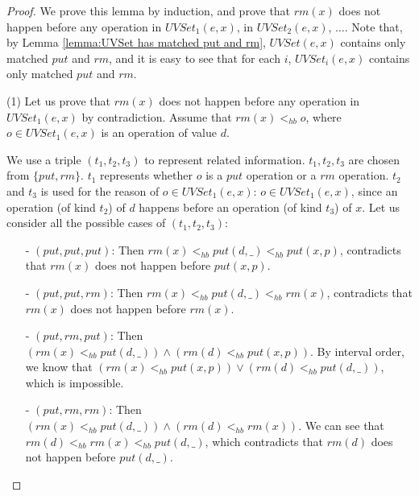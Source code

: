 \begin {proof}

We prove this lemma by induction, and prove that $\textit{rm}(x)$ does not happen before any operation in $\textit{UVSet}_1(e,x)$, in $\textit{UVSet}_2(e,x)$, $\ldots$. Note that, by Lemma \ref{lemma:UVSet has matched put and rm}, $\textit{UVSet}(e,x)$ contains only matched $\textit{put}$ and $\textit{rm}$, and it is easy to see that for each $i$, $\textit{UVSet}_i(e,x)$ contains only matched $\textit{put}$ and $\textit{rm}$.

\noindent (1) Let us prove that $\textit{rm}(x)$ does not happen before any operation in $\textit{UVSet}_1(e,x)$ by contradiction. Assume that $\textit{rm}(x) <_{hb} o$, where $o \in \textit{UVSet}_1(e,x)$ is an operation of value $d$.

We use a triple $(t_1,t_2,t_3)$ to represent related information. $t_1,t_2,t_3$ are chosen from $\{ \textit{put},\textit{rm} \}$. $t_1$ represents whether $o$ is a $\textit{put}$ operation or a $\textit{rm}$ operation. $t_2$ and $t_3$ is used for the reason of $o \in \textit{UVSet}_1(e,x)$: $o \in \textit{UVSet}_1(e,x)$, since an operation (of kind $t_2$) of $d$ happens before an operation (of kind $t_3$) of $x$. Let us consider all the possible cases of $(t_1,t_2,t_3)$:

\begin{itemize}
\setlength{\itemsep}{0.5pt}
\item[-] $(\textit{put},\textit{put},\textit{put})$: Then $\textit{rm}(x) <_{hb} \textit{put}(d,\_) <_{hb} \textit{put}(x,p)$, contradicts that $\textit{rm}(x)$ does not happen before $\textit{put}(x,p)$.

\item[-] $(\textit{put},\textit{put},\textit{rm})$: Then $\textit{rm}(x) <_{hb} \textit{put}(d,\_) <_{hb} \textit{rm}(x)$, contradicts that $\textit{rm}(x)$ does not happen before $\textit{rm}(x)$.

\item[-] $(\textit{put},\textit{rm},\textit{put})$: Then $( \textit{rm}(x) <_{hb} \textit{put}(d,\_) ) \wedge ( \textit{rm}(d) <_{hb} \textit{put}(x,p) )$. By interval order, we know that $( \textit{rm}(x) <_{hb} \textit{put}(x,p) ) \vee ( \textit{rm}(d) <_{hb} \textit{put}(d,\_) )$, which is impossible.

\item[-] $(\textit{put},\textit{rm},\textit{rm})$: Then $( \textit{rm}(x) <_{hb} \textit{put}(d,\_) ) \wedge ( \textit{rm}(d) <_{hb} \textit{rm}(x) )$. We can see that $\textit{rm}(d) <_{hb} \textit{rm}(x) <_{hb} \textit{put}(d,\_)$, which contradicts that $\textit{rm}(d)$ does not happen before $\textit{put}(d,\_)$.


\end{itemize}
\end{proof}
